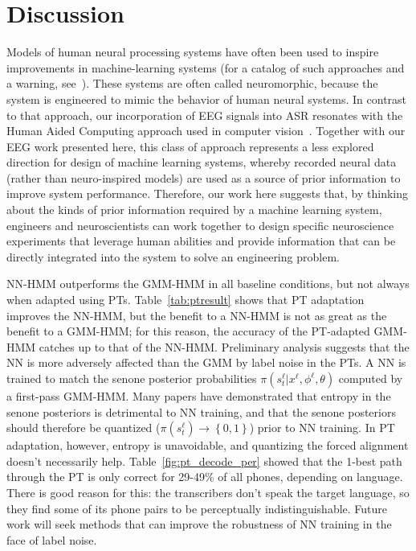 \section{Discussion}

Models of human neural processing systems have often been used to
inspire improvements in machine-learning systems (for a catalog of
such approaches and a warning, see~\cite{Bourlard96}).  These systems
are often called neuromorphic, because the system is engineered to
mimic the behavior of human neural systems. In contrast to that
approach, our incorporation of EEG signals into ASR resonates with the
Human Aided Computing approach used in computer
vision~\cite{Shenoy08,Wang09}. Together with our EEG work presented
here, this class of approach represents a less explored direction for
design of machine learning systems, whereby recorded neural data
(rather than neuro-inspired models) are used as a source of prior
information to improve system performance. Therefore, our work here
suggests that, by thinking about the kinds of prior information
required by a machine learning system, engineers and neuroscientists
can work together to design specific neuroscience experiments that
leverage human abilities and provide information that can be directly
integrated into the system to solve an engineering problem.

NN-HMM outperforms the GMM-HMM in all baseline conditions, but not
always when adapted using PTs. {\color{blue} Table~\ref{tab:ptresult}
  shows that PT adaptation improves the NN-HMM, but the benefit to a
  NN-HMM is not as great as the benefit to a GMM-HMM; for this reason,
  the accuracy of the PT-adapted GMM-HMM catches up to that of the
  NN-HMM.}  Preliminary analysis suggests that the NN is more
adversely affected than the GMM by label noise in the PTs.  A NN is
trained to match the senone posterior probabilities
$\pi(s_t^\ell|x^\ell,\phi^\ell,\theta)$ computed by a first-pass
GMM-HMM.  Many papers have demonstrated that entropy in the senone
posteriors is detrimental to NN training, and that the senone
posteriors should therefore be quantized
($\pi(s_t^\ell)\rightarrow\left\{0,1\right\}$) prior to NN training.
In PT adaptation, however, entropy is unavoidable, and quantizing the
forced alignment doesn't necessarily help.
Table~\ref{fig:pt_decode_per} showed that the 1-best path through the
PT is only correct for 29-49\% of all phones, depending on language.
There is good reason for this: the transcribers don't speak the target
language, so they find some of its phone pairs to be perceptually
indistinguishable.  Future work will seek methods that can improve the
robustness of NN training in the face of label noise.

